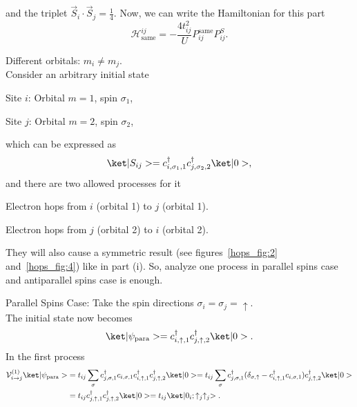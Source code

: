 \begin{solution}
\begin{enumext}[label = \Roman*.]
\begin{enumext}
      and the triplet $\vec S_i \cdot \vec S_j = \frac14$. Now, we can write the
      Hamiltonian for this part
      \[
        \mathcal H_\text{same}^{ij}
      = -\frac{4t_{ij}^2}{U} P_{ij}^\text{same} P_{ij}^S.
      \]
      \item Different orbitals: $m_i \neq m_j$.\\
      Consider an arbitrary initial state
      \begin{enumext}[columns = 2, label = \arabic*.]
        \item Site $i$: Orbital $m = 1$, spin $\sigma_1$,
        \item Site $j$: Orbital $m = 2$, spin $\sigma_2$,
      \end{enumext}
      which can be expressed as
      \[
        \ket|S_{ij}>
      = c_{i,\sigma_1,1}^\dagger c_{j,\sigma_2,2}^\dagger \ket|0>,
      \]
      and there are two allowed processes for it
      \begin{enumext}[label = \arabic*.]
        \item Electron hops from $i$ (orbital 1) to $j$ (orbital 1).
        \item Electron hops from $j$ (orbital 2) to $i$ (orbital 2).
      \end{enumext}
      They will also cause a symmetric result (see figures~\ref{hops_fig:2}
      and~\ref{hops_fig:4}) like in part (i).
      So, analyze one process in parallel spins case and antiparallel
      spins case is enough.
      \begin{enumext}[label = \arabic*.]
        \item Parallel Spins Case: Take the spin
        directions $\sigma_i = \sigma_j = \uparrow$.\\
        The initial state now becomes
        \[
          \ket|\psi_\text{para}> = c_{i,\uparrow,1}^\dagger
            c_{j, \uparrow, 2}^\dagger \ket|0>.
        \]
        In the first process
        \begin{align*}
          \mathcal V_{i\to j}^{(1)} \ket|\psi_\text{para}> &
        = t_{ij} \sum_\sigma c_{j,\sigma,1}^\dagger c_{i,\sigma,1}
          c_{i,\uparrow,1}^\dagger c_{j,\uparrow,2}^\dagger \ket|0>
        = t_{ij} \sum_\sigma c_{j,\sigma,1}^\dagger
          (\delta_{\sigma,\uparrow} - c_{i,\uparrow,1}^\dagger c_{i,\sigma,1})
          c_{j,\uparrow,2}^\dagger \ket|0>\\
      & = t_{ij} c_{j,\uparrow,1}^\dagger c_{j,\uparrow,2}^\dagger \ket|0>
        = t_{ij} \ket|0_i;\uparrow_j\uparrow_j>.
        \end{align*}

\end{enumext}
\end{enumext}
\end{enumext}
\end{solution}
